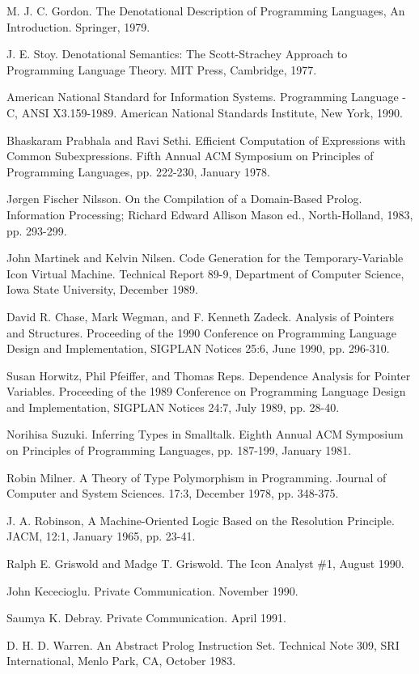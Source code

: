 \begin{noIndex}
\noindent
[denote] M. J. C. Gordon. The Denotational Description of Programming
Languages, An Introduction. Springer, 1979.

\noindent
[Stoy] J. E. Stoy. Denotational Semantics: The Scott-Strachey Approach
to Programming Language Theory. MIT Press, Cambridge, 1977.

\noindent
[ansi-c] American National Standard for Information
Systems. Programming Language - C, ANSI X3.159-1989. American National
Standards Institute, New York, 1990.

\noindent
[Prabhala] Bhaskaram Prabhala and Ravi Sethi. Efficient Computation of
Expressions with Common Subexpressions. Fifth Annual ACM Symposium on
Principles of Programming Languages, pp. 222-230, January 1978.

\noindent
[Nilsson] J{\o}rgen Fischer Nilsson. On the Compilation of a
Domain-Based Prolog. Information Processing; Richard Edward Allison
Mason ed., North-Holland, 1983, pp. 293-299.

\noindent
[Martinek] John Martinek and Kelvin Nilsen. Code Generation for the
Temporary-Variable Icon Virtual Machine. Technical Report 89-9,
Department of Computer Science, Iowa State University, December 1989.

\noindent
[pntstr] David R. Chase, Mark Wegman, and F. Kenneth Zadeck. Analysis
of Pointers and Structures. Proceeding of the 1990 Conference on
Programming Language Design and Implementation, SIGPLAN Notices 25:6,
June 1990, pp. 296-310.

\noindent
[depptr] Susan Horwitz, Phil Pfeiffer, and Thomas Reps. Dependence
Analysis for Pointer Variables. Proceeding of the 1989 Conference on
Programming Language Design and Implementation, SIGPLAN Notices 24:7,
July 1989, pp. 28-40.

 Norihisa Suzuki. Inferring Types in Smalltalk. Eighth
Annual ACM Symposium on Principles of Programming Languages,
pp. 187-199, January 1981.

\noindent
[Milner] Robin Milner. A Theory of Type Polymorphism in
Programming. Journal of Computer and System Sciences. 17:3, December
1978, pp. 348-375.

\noindent
[unify] J. A. Robinson, A Machine-Oriented Logic Based on the
Resolution Principle. JACM, 12:1, January 1965, pp.  23-41.

\noindent
[ianl1] Ralph E. Griswold and Madge T. Griswold. The Icon Analyst \#1,
August 1990.

\noindent
[johnk] John Kececioglu. Private Communication. November 1990.

 Saumya K. Debray. Private Communication. April 1991.

\noindent
[wam] D. H. D. Warren. An Abstract Prolog Instruction Set. Technical
Note 309, SRI International, Menlo Park, CA, October 1983.
\end{noIndex}
